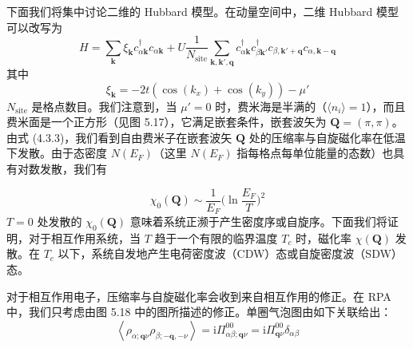 下面我们将集中讨论二维的 Hubbard 模型。在动量空间中，二维 Hubbard 模型可以改写为
\begin{equation*}
H=\sum_{\pmb{k}}\xi_{\pmb{k}}c^{\dagger}_{\alpha\pmb{k}}c_{\alpha\pmb{k}}+U\frac{1}{N_{\mathrm{site}}}\sum_{\pmb{k},\pmb{k}',\pmb{q}}c^{\dagger}_{\alpha\pmb{k}}c^{\dagger}_{\beta\pmb{k}'}c_{\beta,\pmb{k}'+\pmb{q}}c_{\alpha,\pmb{k}-\pmb{q}}
\end{equation*}
其中
\begin{equation*}
\xi_{\pmb{k}}=-2t\left(\cos(k_{x})+\cos(k_{y})\right)-\mu'
\end{equation*}
$N_{\mathrm{site}}$ 是格点数目。我们注意到，当 $\mu'=0$ 时，费米海是半满的（$\langle n_{i}\rangle=1$），而且费米面是一个正方形（见图 5.17），它满足嵌套条件，嵌套波矢为 $\pmb{Q}=(\pi,\pi)$。由式 (4.3.3)，我们看到自由费米子在嵌套波矢 $\pmb{Q}$ 处的压缩率与自旋磁化率在低温下发散。由于态密度 $N(E_{F})$（这里 $N(E_{F})$ 指每格点每单位能量的态数）也具有对数发散，我们有



\begin{equation*}
\chi_{0}(\pmb{Q})\sim\frac{1}{E_{F}}\big(\ln\frac{E_{F}}{T}\big)^{2}\tag{5.5.2}
\end{equation*}
$T=0$ 处发散的 $\chi_{0}(\pmb{Q})$ 意味着系统正濒于产生密度序或自旋序。下面我们将证明，对于相互作用系统，当 $T$ 趋于一个有限的临界温度 $T_{c}$ 时，磁化率 $\chi(\pmb{Q})$ 发散。在 $T_{c}$ 以下，系统自发地产生电荷密度波（CDW）态或自旋密度波（SDW）态。

对于相互作用电子，压缩率与自旋磁化率会收到来自相互作用的修正。在 RPA 中，我们只考虑由图 5.18 中的图所描述的修正。单圈气泡图由如下关联给出：
\begin{equation*}
\left\langle \rho_{\alpha;\pmb{q}\nu}\rho_{\beta;-\pmb{q},-\nu}\right\rangle=\mathrm{i}\Pi^{00}_{\alpha\beta;\pmb{q}\nu}=\mathrm{i}\Pi^{00}_{\pmb{q}\nu}\delta_{\alpha\beta}
\end{equation*}


